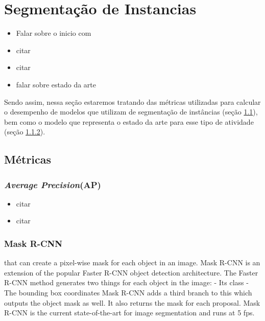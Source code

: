 \newpage
\clearpage
\section{Segmentação de Instancias}
\label{instance:instance}
\begin{itemize}
    \item Falar sobre o inicio com \cite{Vaillant1994}
    \item citar \cite{Minaee2021}
    \item citar \cite{Bolya2019}
    \item falar sobre estado da arte \cite{Hafiz2020}
\end{itemize}
Sendo assim, nessa seção estaremos tratando das métricas utilizadas para calcular o desempenho de modelos que utilizam de segmentação de instâncias (seção \ref{instance:metrics}), bem como o modelo que representa o estado da arte para esse tipo de atividade (seção \ref{instance:mask}).


\subsection{Métricas}
\label{instance:metrics}


\subsubsection{\textit{Average Precision}(AP)}
\label{instance:AP}
\begin{itemize}
    \item citar \cite{Hariharan2014}
    \item citar \cite{Lin2014}
\end{itemize}


\subsubsection{Mask R-CNN}
\label{instance:mask}
that can create a pixel-wise mask for each object in an image.
Mask R-CNN is an extension of the popular Faster R-CNN object detection architecture.
The Faster R-CNN method generates two things for each object in the image:
 - Its class
 - The bounding box coordinates
Mask R-CNN adds a third branch to this which outputs the object mask as well.
It also returns the mask for each proposal.
Mask R-CNN is the current state-of-the-art for image segmentation and runs at 5 fps.

